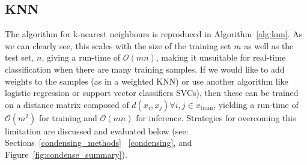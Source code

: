 \documentclass[conference]{IEEEtran}
\newcommand{\cm}[1]{\textit{{\color{blue}#1}}}
\begin{document}

\subsection{KNN}
\label{runtime}
The algorithm for k-nearest neighbours is reproduced in Algorithm~\ref{alg:knn}. As we can clearly see, this scales with the size of the training set $m$ as well as the test set, $n$, giving a run-time of $\mathcal{O}(mn)$, making it unsuitable for real-time classification when there are many training samples. If we would like to add weights to the samples (as in a weighted KNN) or use another algorithm like logistic regression or support vector classifiers SVCs), then these can be trained on a distance matrix composed of $d(x_i, x_j) \forall i,j \in x_{\text{train}}$, yielding a run-time of $\mathcal{O}(m^2)$ for training and $\mathcal{O}(mn)$ for inference. Strategies for overcoming this limitation are discussed and evaluated below (see: Sections~\ref{condensing_methods} ~\ref{condensing}, and Figure~\ref{fig:condense_summary}). 
\end{document}
